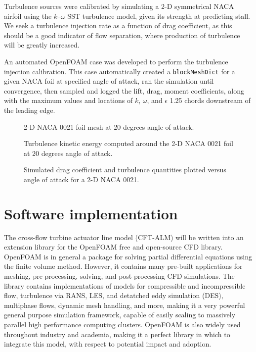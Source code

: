 Turbulence sources were calibrated by simulating a 2-D symmetrical NACA airfoil
using the $k$--$\omega$ SST turbulence model, given its strength at predicting
stall. We seek a turbulence injection rate as a function of drag coefficient, as
this should be a good indicator of flow separation, where production of
turbulence will be greatly increased.

An automated OpenFOAM case was developed to perform the turbulence injection
calibration. This case automatically created a \texttt{blockMeshDict} for a
given NACA foil at specified angle of attack, ran the simulation until
convergence, then sampled and logged the lift, drag, moment coefficients, along
with the maximum values and locations of $k$, $\omega$, and $\epsilon$ 1.25
chords downstream of the leading edge.

\begin{figure}[ht]
    \centering
    
    \caption{2-D NACA 0021 foil mesh at 20 degrees angle of attack.}
    
    \label{fig:NACA-foil-mesh}
\end{figure}


\begin{figure}[ht]
    \centering
    
    \caption{Turbulence kinetic energy computed around the 2-D NACA 0021 foil at
        20 degrees angle of attack.}
    
    \label{fig:NACA-foil-k}
\end{figure}


\begin{figure}[ht]
    \centering
    
    \caption{Simulated drag coefficient and turbulence quantities plotted versus
        angle of attack for a 2-D NACA 0021.}
    
    \label{fig:NACA-foil-turbulence}
\end{figure}


\section{Software implementation}

The cross-flow turbine actuator line model (CFT-ALM) will be written into an
extension library for the OpenFOAM free and open-source CFD library. OpenFOAM is
in general a package for solving partial differential equations using the finite
volume method. However, it contains many pre-built applications for meshing,
pre-processing, solving, and post-processing CFD simulations. The library
contains implementations of models for compressible and incompressible flow,
turbulence via RANS, LES, and detatched eddy simulation (DES), multiphase flows,
dynamic mesh handling, and more, making it a very powerful general purpose
simulation framework, capable of easily scaling to massively parallel high
performance computing clusters. OpenFOAM is also widely used throughout industry
and academia, making it a perfect library in which to integrate this model, with
respect to potential impact and adoption.

